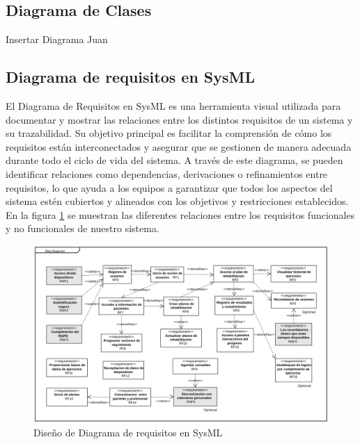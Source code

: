 \documentclass{article}
\begin{document}
\subsection{Diagrama de Clases}

Insertar Diagrama Juan

\subsection{Diagrama de requisitos en  SysML}

El Diagrama de Requisitos en SysML es una herramienta visual utilizada para documentar y mostrar las relaciones entre los distintos requisitos de un sistema y su trazabilidad. Su objetivo principal es facilitar la comprensión de cómo los requisitos están interconectados y asegurar que se gestionen de manera adecuada durante todo el ciclo de vida del sistema. A través de este diagrama, se pueden identificar relaciones como dependencias, derivaciones o refinamientos entre requisitos, lo que ayuda a los equipos a garantizar que todos los aspectos del sistema estén cubiertos y alineados con los objetivos y restricciones establecidos.
\\

En la figura \ref{fig:SysML} se muestran las diferentes relaciones entre los requisitos funcionales y no funcionales de nuestro sistema.

\begin{figure}
	\begin{center} 
		\includegraphics[width=1\textwidth]{images/SysML.png}
		\caption{Diseño de Diagrama de requisitos en SysML}
		\label{fig:SysML}
	\end{center}
\end{figure}
\end{document}

